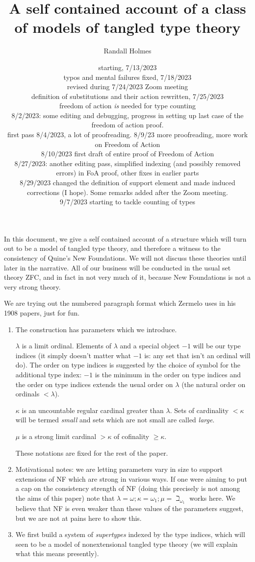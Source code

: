 \documentclass[12pt]{article}
\title{A self contained account of a class of models of tangled type theory}
\author{Randall Holmes}
\date{starting, 7/13/2023\\
typos and mental failures fixed, 7/18/2023\\
revised during 7/24/2023 Zoom meeting\\definition of substitutions and their action rewritten, 7/25/2023\\
freedom of action {\em is} needed for type counting\\
8/2/2023:  some editing and debugging, progress in setting up last case of the freedom of action proof.\\
first pass 8/4/2023, a lot of proofreading.
8/9/23 more proofreading, more work on Freedom of Action\\
8/10/2023 first draft of entire proof of Freedom of Action\\
8/27/2023:  another editing pass, simplified indexing (and possibly removed errors) in FoA proof, other fixes in earlier parts\\
8/29/2023 changed the definition of support element and made induced corrections (I hope).  Some remarks added after the Zoom meeting.\\
9/7/2023 starting to tackle counting of types}
\begin{document}
\maketitle

\newpage

In this document, we give a self contained account of a structure which will turn out to be a model of tangled type theory, and therefore a witness to the consistency of Quine's New Foundations.
We will not discuss these theories until later in the narrative.  All of our business will be conducted in the usual set theory ZFC, and in fact in not very much of it, because New Foundations is not a very strong theory.

We are trying out the numbered paragraph format which Zermelo uses in his 1908 papers, just for fun.

\begin{enumerate}

\item The construction has parameters which we introduce.

$\lambda$ is a limit ordinal.  Elements of $\lambda$ and a special object $-1$ will be our type indices (it simply doesn't matter what $-1$ is:  any set that isn't an ordinal will do).  The order on type indices is suggested by the choice of symbol for the additional type index:  $-1$ is the minimum in the order on type indices and the order on type indices extends the usual order on $\lambda$ (the natural order on ordinals $<\lambda$).

$\kappa$ is an uncountable regular cardinal greater than $\lambda$.  Sets of cardinality $<\kappa$ will be termed {\em small\/} and sets which are not small are called {\em large\/}.

$\mu$ is a strong limit cardinal $>\kappa$ of cofinality $\geq \kappa$.

These notations are fixed for the rest of the paper.

\item  Motivational notes:  we are letting parameters vary in size to support extensions of NF which are strong in various ways.  If one were aiming to put a cap on the consistency strength of NF (doing this precisely is not among the aims of this paper) note that $\lambda = \omega; \kappa = \omega_1; \mu = \beth_{\omega_1}$ works here.  We believe that NF is even weaker than these values of the parameters suggest, but we are not at pains here to show this.

\item We first build a system of {\em supertypes\/} indexed by the type indices, which will seen to be a model of nonextensional tangled type theory (we will explain what this means presently).


\end{enumerate}
\end{document}
